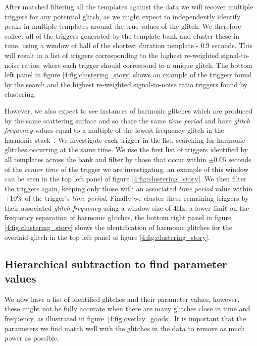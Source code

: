 After matched filtering all the templates against the data we will recover multiple triggers for any potential \scl{} glitch, as we might expect to independently identify peaks in multiple templates around the true values of the glitch. We therefore collect all of the triggers generated by the template bank and cluster these in time, using a window of half of the shortest duration template - $0.9$ seconds. This will result in a list of triggers corresponding to the highest re-weighted signal-to-noise ratios, where each trigger should correspond to a unique \scl{} glitch. The bottom left panel in figure \ref{4:fig:clustering_story} shows an example of the triggers found by the search and the highest re-weighted signal-to-noise ratio triggers found by clustering.

However, we also expect to see instances of harmonic glitches which are produced by the same scattering surface and so share the same \emph{time period} and have \emph{glitch frequency} values equal to a multiple of the lowest frequency glitch in the harmonic stack~\cite{TAccadia:2010}. We investigate each trigger in the list, searching for harmonic glitches occurring at the same time. We use the first list of triggers identified by all templates across the bank and filter by those that occur within $\pm0.05$ seconds of the \emph{center time} of the trigger we are investigating, an example of this window can be seen in the top left panel of figure \ref{4:fig:clustering_story}. We then filter the triggers again, keeping only those with an associated \emph{time period} value within $\pm 10 \%$ of the trigger's \emph{time period}. Finally we cluster these remaining triggers by their associated \emph{glitch frequency} using a window size of $4$Hz, a lower limit on the frequency separation of harmonic glitches, the bottom right panel in figure \ref{4:fig:clustering_story} shows the identification of harmonic glitches for the overlaid \scl{} glitch in the top left panel of figure \ref{4:fig:clustering_story}.

\subsection{Hierarchical subtraction to find parameter values}

We now have a list of identified \scl{} glitches and their parameter values, however, these might not be fully accurate when there are many glitches close in time and frequency, as illustrated in figure~\ref{4:fig:overlay_goods}. It is important that the parameters we find match well with the glitches in the data to remove as much power as possible.

